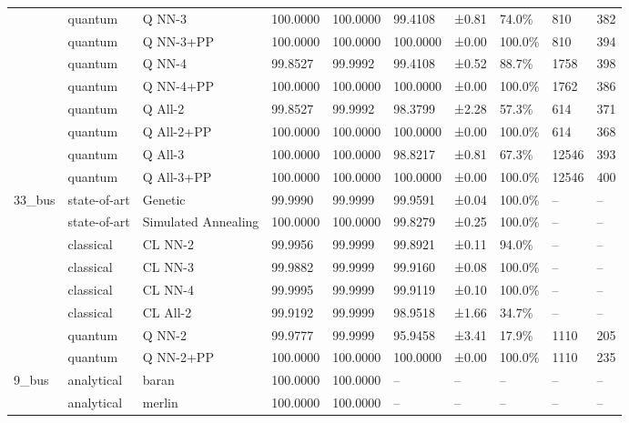 \begin{table}[ht]
\begin{tabular}{llllllllll}
\rowcolor{orange!12}
 & quantum & Q NN-3 & 100.0000 & 100.0000 & 99.4108 & ±0.81 & 74.0\% & 810 & 382 \\
\rowcolor{orange!12}
 & quantum & Q NN-3+PP & 100.0000 & 100.0000 & 100.0000 & ±0.00 & 100.0\% & 810 & 394 \\
\rowcolor{orange!12}
 & quantum & Q NN-4 & 99.8527 & 99.9992 & 99.4108 & ±0.52 & 88.7\% & 1758 & 398 \\
\rowcolor{orange!12}
 & quantum & Q NN-4+PP & 100.0000 & 100.0000 & 100.0000 & ±0.00 & 100.0\% & 1762 & 386 \\
\rowcolor{orange!12}
 & quantum & Q All-2 & 99.8527 & 99.9992 & 98.3799 & ±2.28 & 57.3\% & 614 & 371 \\
\rowcolor{orange!12}
 & quantum & Q All-2+PP & 100.0000 & 100.0000 & 100.0000 & ±0.00 & 100.0\% & 614 & 368 \\
\rowcolor{orange!12}
 & quantum & Q All-3 & 100.0000 & 100.0000 & 98.8217 & ±0.81 & 67.3\% & 12546 & 393 \\
\rowcolor{orange!12}
 & quantum & Q All-3+PP & 100.0000 & 100.0000 & 100.0000 & ±0.00 & 100.0\% & 12546 & 400 \\
\midrule
\rowcolor{blue!10}
33\_bus & state-of-art & Genetic & 99.9990 & 99.9999 & 99.9591 & ±0.04 & 100.0\% & – & – \\
\rowcolor{blue!10}
 & state-of-art & Simulated Annealing & 100.0000 & 100.0000 & 99.8279 & ±0.25 & 100.0\% & – & – \\
\rowcolor{green!10}
 & classical & CL NN-2 & 99.9956 & 99.9999 & 99.8921 & ±0.11 & 94.0\% & – & – \\
\rowcolor{green!10}
 & classical & CL NN-3 & 99.9882 & 99.9999 & 99.9160 & ±0.08 & 100.0\% & – & – \\
\rowcolor{green!10}
 & classical & CL NN-4 & 99.9995 & 99.9999 & 99.9119 & ±0.10 & 100.0\% & – & – \\
\rowcolor{green!10}
 & classical & CL All-2 & 99.9192 & 99.9999 & 98.9518 & ±1.66 & 34.7\% & – & – \\
\rowcolor{orange!12}
 & quantum & Q NN-2 & 99.9777 & 99.9999 & 95.9458 & ±3.41 & 17.9\% & 1110 & 205 \\
\rowcolor{orange!12}
 & quantum & Q NN-2+PP & 100.0000 & 100.0000 & 100.0000 & ±0.00 & 100.0\% & 1110 & 235 \\
\midrule
\rowcolor{gray!10}
9\_bus & analytical & baran & 100.0000 & 100.0000 & – & – & – & – & – \\
\rowcolor{gray!10}
 & analytical & merlin & 100.0000 & 100.0000 & – & – & – & – & – \\

\end{tabular}
\end{table}
